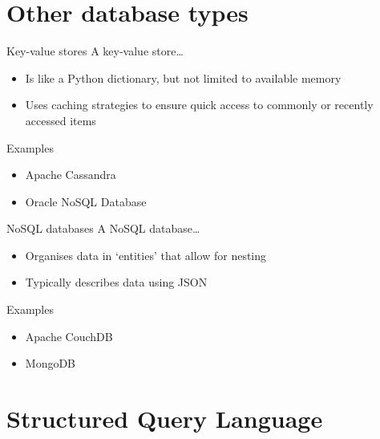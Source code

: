 \section{Other database types}

\begin{frame}{Key-value stores}
    A key\hyp{}value store\ldots\vspace{-1ex}
    \begin{itemize}
        \item Is like a Python \alert{dictionary}, but not limited to available
              memory
        \item Uses \alert{caching} strategies to ensure quick access to
              commonly or recently accessed items
    \end{itemize}
    \vfill
    \begin{block}{Examples}
        \begin{itemize}
            \item Apache Cassandra
            \item Oracle NoSQL Database
        \end{itemize}
    \end{block}
\end{frame}

\begin{frame}{NoSQL databases}
    A NoSQL database\ldots\vspace{-1ex}
    \begin{itemize}
        \item Organises data in ‘entities’ that allow for \alert{nesting}
        \item Typically describes data using \alert{JSON}
    \end{itemize}
    \vfill
    \begin{block}{Examples}
        \begin{itemize}
            \item Apache CouchDB
            \item MongoDB
        \end{itemize}
    \end{block}
\end{frame}

\section{Structured Query Language}

